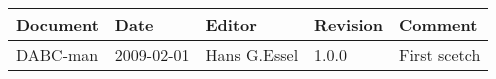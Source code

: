 \begin{table}[h]
\begin{tabular}{|p{2.0cm}|p{2.0cm}|p{3.0cm}|p{1.6cm}|p{5.0cm}|} \hline
Document   & Date        & Editor       & Revision & Comment \\ \hline
DABC-man & 2009-02-01 & Hans G.Essel & 1.0.0      & First scetch \\ \hline
\end{tabular}
\end{table}
